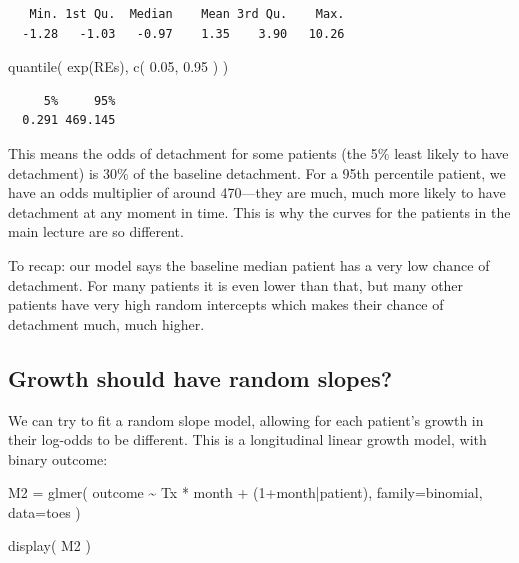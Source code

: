 \documentclass[
  letterpaper,
  DIV=11,
  numbers=noendperiod]{scrreprt}
\newenvironment{Shaded}{}{}
\newcommand{\AttributeTok}[1]{\textcolor[rgb]{0.49,0.56,0.16}{#1}}
\newcommand{\DecValTok}[1]{\textcolor[rgb]{0.25,0.63,0.44}{#1}}
\newcommand{\FloatTok}[1]{\textcolor[rgb]{0.25,0.63,0.44}{#1}}
\newcommand{\FunctionTok}[1]{\textcolor[rgb]{0.02,0.16,0.49}{#1}}
\newcommand{\NormalTok}[1]{#1}
\newcommand{\OtherTok}[1]{\textcolor[rgb]{0.00,0.44,0.13}{#1}}
\newcommand{\SpecialCharTok}[1]{\textcolor[rgb]{0.25,0.44,0.63}{#1}}
\begin{document}
\begin{verbatim}
   Min. 1st Qu.  Median    Mean 3rd Qu.    Max. 
  -1.28   -1.03   -0.97    1.35    3.90   10.26 
\end{verbatim}

\begin{Shaded}
\begin{Highlighting}[]
\FunctionTok{quantile}\NormalTok{( }\FunctionTok{exp}\NormalTok{(REs), }\FunctionTok{c}\NormalTok{( }\FloatTok{0.05}\NormalTok{, }\FloatTok{0.95}\NormalTok{ ) )}
\end{Highlighting}
\end{Shaded}

\begin{verbatim}
     5%     95% 
  0.291 469.145 
\end{verbatim}

This means the odds of detachment for some patients (the 5\% least
likely to have detachment) is 30\% of the baseline detachment. For a
95th percentile patient, we have an odds multiplier of around 470---they
are much, much more likely to have detachment at any moment in time.
This is why the curves for the patients in the main lecture are so
different.

To recap: our model says the baseline median patient has a very low
chance of detachment. For many patients it is even lower than that, but
many other patients have very high random intercepts which makes their
chance of detachment much, much higher.

\subsection{Growth should have random
slopes?}\label{growth-should-have-random-slopes}

We can try to fit a random slope model, allowing for each patient's
growth in their log-odds to be different. This is a longitudinal linear
growth model, with binary outcome:

\begin{Shaded}
\begin{Highlighting}[]
\NormalTok{M2 }\OtherTok{=} \FunctionTok{glmer}\NormalTok{( outcome }\SpecialCharTok{\textasciitilde{}}\NormalTok{ Tx }\SpecialCharTok{*}\NormalTok{ month }\SpecialCharTok{+}\NormalTok{ (}\DecValTok{1}\SpecialCharTok{+}\NormalTok{month}\SpecialCharTok{|}\NormalTok{patient),}
            \AttributeTok{family=}\NormalTok{binomial,}
            \AttributeTok{data=}\NormalTok{toes )}


\FunctionTok{display}\NormalTok{( M2 )}
\end{Highlighting}
\end{Shaded}
\end{document}
